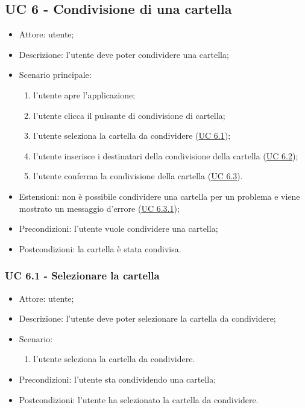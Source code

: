     \subsection{UC 6 - Condivisione di una cartella}
    \begin{itemize}
        \item Attore: utente;
        \item Descrizione: l'utente deve poter condividere una cartella;
        \item Scenario principale:
            \begin{enumerate}
            \item l’utente apre l’applicazione;
            \item l’utente clicca il pulsante di condivisione di cartella;
            \item l'utente seleziona la cartella da condividere (\hyperref[sec: UC 6.1]{UC 6.1});
            \item l'utente inserisce i destinatari della condivisione della cartella (\hyperref[sec: UC 6.2]{UC 6.2});  
            \item l'utente conferma la condivisione della cartella (\hyperref[sec: UC 6.3]{UC 6.3}).          
            \end{enumerate}
        \item Estensioni: non è possibile condividere una cartella per un problema e viene mostrato un messaggio d'errore (\hyperref[sec: UC 6.3.1]{UC 6.3.1});
        \item Precondizioni: l'utente vuole condividere una cartella;
        \item Postcondizioni: la cartella è stata condivisa.
    \end{itemize}

    \subsubsection{UC 6.1 - Selezionare la cartella} \label{sec: UC 6.1}
    \begin{itemize}
        \item Attore: utente;
        \item Descrizione: l'utente deve poter selezionare la cartella da condividere;
        \item Scenario:
        \begin{enumerate}
        \item l'utente seleziona la cartella da condividere.
        \end{enumerate}
        \item Precondizioni: l'utente sta condividendo una cartella;
        \item Postcondizioni: l'utente ha selezionato la cartella da condividere.
    \end{itemize}
